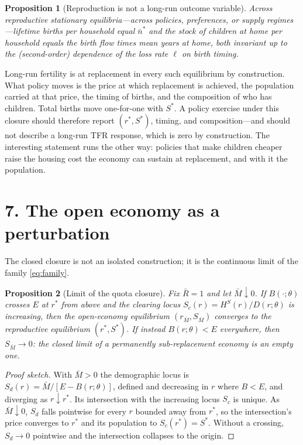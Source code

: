 \documentclass[11pt]{article}
\newtheorem{proposition}{Proposition}
\theoremstyle{definition}
\begin{document}
\begin{proposition}[Reproduction is not a long-run outcome variable]\label{prop:invariance}
Across reproductive stationary equilibria---across policies, preferences, or
supply regimes---lifetime births per household equal $\bar n^{*}$ and the
stock of children at home per household equals the birth flow times mean years
at home, both invariant up to the (second-order) dependence of the loss rate
$\ell$ on birth timing.
\end{proposition}

Long-run fertility is at replacement in every such equilibrium by
construction. What policy moves is the price at which replacement is
achieved, the population carried at that price, the timing of births, and the
composition of who has children. Total births move one-for-one with $S^{*}$.
A policy exercise under this closure should therefore report $(r^{*},
S^{*})$, timing, and composition---and should not describe a long-run TFR
response, which is zero by construction. The interesting statement runs the
other way: policies that make children cheaper raise the housing cost the
economy can sustain at replacement, and with it the population.

\section*{7. The open economy as a perturbation}

The closed closure is not an isolated construction; it is the continuous limit
of the family \eqref{eq:family}.

\begin{proposition}[Limit of the quota closure]\label{prop:limit}
Fix $\bar R=1$ and let $\bar M\downarrow0$. If $B(\cdot;\theta)$ crosses $E$
at $r^{*}$ from above and the clearing locus $S_c(r)=H^S(r)/D(r;\theta)$ is
increasing, then the open-economy equilibrium $(r_{\bar M},S_{\bar M})$
converges to the reproductive equilibrium $(r^{*},S^{*})$. If instead
$B(r;\theta)<E$ everywhere, then $S_{\bar M}\to0$: the closed limit of a
permanently sub-replacement economy is an empty one.
\end{proposition}

\begin{proof}[Proof sketch]
With $\bar M>0$ the demographic locus is $S_d(r)=\bar M/[E-B(r;\theta)]$,
defined and decreasing in $r$ where $B<E$, and diverging as $r\downarrow
r^{*}$. Its intersection with the increasing locus $S_c$ is unique. As
$\bar M\downarrow0$, $S_d$ falls pointwise for every $r$ bounded away from
$r^{*}$, so the intersection's price converges to $r^{*}$ and its population
to $S_c(r^{*})=S^{*}$. Without a crossing, $S_d\to0$ pointwise and the
intersection collapses to the origin.
\end{proof}
\end{document}
